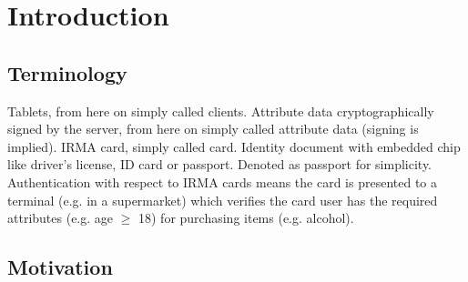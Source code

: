 \section{Introduction}

\subsection{Terminology}
Tablets, from here on simply called clients.
Attribute data cryptographically signed by the server, from here on simply called attribute data (signing is implied).
IRMA card, simply called card.
Identity document with embedded chip like driver's license, ID card or passport. Denoted as passport for simplicity.
Authentication with respect to IRMA cards means the card is presented to a terminal (e.g. in a supermarket) which verifies the card user has the required attributes (e.g. age $\geq$ 18) for purchasing items (e.g. alcohol).

\subsection{Motivation}
